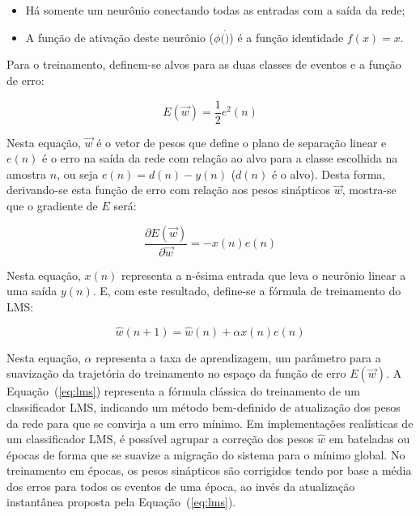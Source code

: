 \begin{itemize}
\item Há somente um neurônio conectando todas as entradas com a saída da rede;
\item A função de ativação deste neurônio ($\phi(\dot)$) é a função identidade
$f(x) = x$.
\end{itemize}

Para o treinamento, definem-se alvos para as duas classes de eventos e a
função de erro:

\begin{equation}
E(\overrightarrow{w}) = \frac{1}{2} e^2(n)
\label{eq:mse-definition}
\end{equation}

Nesta equação, $\overrightarrow{w}$ é o vetor de pesos que define o plano de
separação linear e $e(n)$ é o erro na saída da rede com relação ao alvo para a
classe escolhida na amostra $n$, ou seja $e(n) = d(n)-y(n)$ ($d(n)$ é o
alvo). Desta forma, derivando-se esta função de erro com relação aos pesos
sinápticos $\overrightarrow{w}$, mostra-se que o gradiente de $E$ será:

\begin{equation}
\frac{\partial E(\overrightarrow{w})}{\partial \overrightarrow{w}} =
-x(n)e(n) 
\end{equation}

Nesta equação, $x(n)$ representa a n-ésima entrada que leva o neurônio linear
a uma saída $y(n)$. E, com este resultado, define-se a fórmula de treinamento
do LMS:

\begin{equation}
\hat{w}(n+1) = \hat{w}(n) + \alpha x(n)e(n)
\label{eq:lms}
\end{equation}

Nesta equação, $\alpha$ representa a taxa de aprendizagem, um parâmetro para a
suavização da trajetória do treinamento no espaço da função de erro
$E(\overrightarrow{w})$. A Equação~(\ref{eq:lms}) representa a fórmula
clássica do treinamento de um classificador LMS, indicando um método
bem-definido de atualização dos pesos da rede para que se convirja a um erro
mínimo. Em implementações realísticas de um classificador LMS, é possível
agrupar a correção dos pesos $\hat{w}$ em bateladas ou épocas de forma que se
suavize a migração do sistema para o mínimo global. No treinamento em épocas,
os pesos sinápticos são corrigidos tendo por base a média dos erros para todos
os eventos de uma época, ao invés da atualização instantânea proposta pela
Equação~(\ref{eq:lms}).

